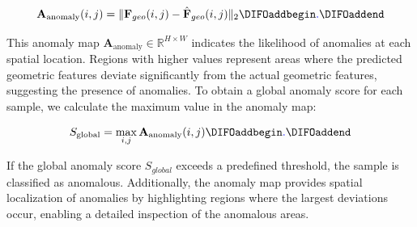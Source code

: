 \begin{equation}
\mathbf{A}_{\text{anomaly}}(i, j) = \|\mathbf{F}_{geo}(i, j) - \hat{\mathbf{F}}_{geo}(i, j)\|_2\DIFaddbegin \DIFadd{.
}\DIFaddend \end{equation}

\noindent This anomaly map $\mathbf{A}_{\text{anomaly}} \in \mathbb{R}^{H \times W}$ indicates the likelihood of anomalies at each spatial location. Regions with higher values represent areas where the predicted geometric features deviate significantly from the actual geometric features, suggesting the presence of anomalies. \DIFaddbegin {}\DIFaddend To obtain a global anomaly score for each sample, we calculate the maximum value in the \DIFaddbegin {}\DIFaddend anomaly map:

\begin{equation}
S_{\text{global}} = \max_{i,j} \mathbf{A}_{\text{anomaly}}(i, j)\DIFaddbegin \DIFadd{.
}\DIFaddend \end{equation}

\noindent If the global anomaly score $S_{global}$ exceeds a predefined threshold, the sample is classified as anomalous\DIFaddbegin {}\DIFaddend . Additionally, the anomaly map provides spatial localization of anomalies by highlighting regions where the largest deviations occur, enabling a detailed inspection of the anomalous areas. 
